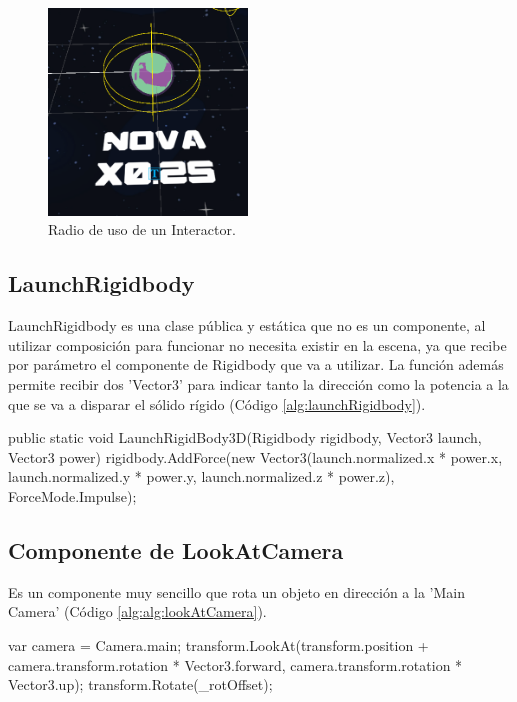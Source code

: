 \begin{figure}[H]
  \centering
    \includegraphics[width=200px,clip=true]{interactor.png}
  \caption{Radio de uso de un Interactor.}
  \label{fig:interactor}
\end{figure}

\subsection{LaunchRigidbody}
LaunchRigidbody es una clase pública y estática que no es un componente, al utilizar composición para funcionar no necesita existir en la escena, ya que recibe por parámetro 
el componente de Rigidbody que va a utilizar. La función además permite recibir dos 'Vector3' para indicar tanto la dirección como la potencia a la que se va a disparar el 
sólido rígido (Código \ref{alg:launchRigidbody}).

\begin{mypython}[caption={Funcionamiento de LaunchRigidbody.},label={alg:launchRigidbody}]
    public static void LaunchRigidBody3D(Rigidbody rigidbody, Vector3 launch, Vector3 power)
    {
        rigidbody.AddForce(new Vector3(launch.normalized.x * power.x, launch.normalized.y * power.y, launch.normalized.z * power.z), ForceMode.Impulse);
    }
\end{mypython}
    
\subsection{Componente de LookAtCamera}
Es un componente muy sencillo que rota un objeto en dirección a la 'Main Camera' (Código \ref{alg:alg:lookAtCamera}).

\begin{mypython}[caption={Funcionamiento de LookAtCamera.},label={alg:lookAtCamera}]
    var camera = Camera.main;
    transform.LookAt(transform.position + camera.transform.rotation * Vector3.forward, camera.transform.rotation * Vector3.up);
    transform.Rotate(_rotOffset);
\end{mypython}

